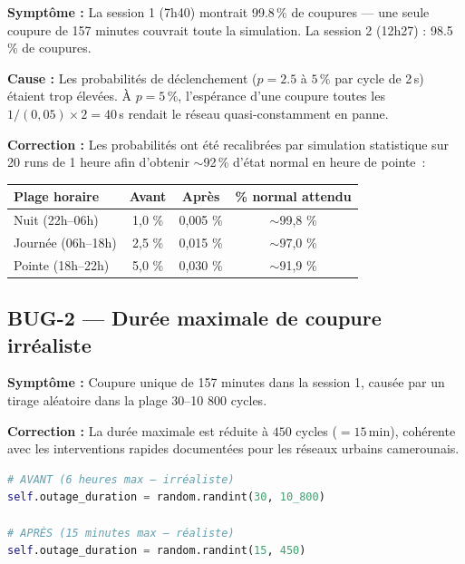 \documentclass[12pt,a4paper]{article}
\begin{document}
\begin{mdframed}[style=danger]
\textbf{Symptôme :} La session 1 (7h40) montrait 99.8\,\% de
coupures — une seule coupure de 157 minutes couvrait toute la
simulation. La session 2 (12h27) : 98.5\,\% de coupures.
\end{mdframed}

\textbf{Cause :} Les probabilités de déclenchement ($p = 2.5$ à
$5\,\%$ par cycle de 2\,s) étaient trop élevées.
À $p = 5\,\%$, l'espérance d'une coupure toutes les $1/(0{,}05)
\times 2 = 40$\,s rendait le réseau quasi-constamment en panne.

\textbf{Correction :} Les probabilités ont été recalibrées par
simulation statistique sur 20 runs de 1 heure afin d'obtenir
$\sim$92\,\% d'état normal en heure de pointe~:

\begin{center}
\begin{tabular}{lccc}
\toprule
\textbf{Plage horaire} & \textbf{Avant} & \textbf{Après} &
\textbf{\% normal attendu} \\
\midrule
Nuit (22h–06h)   & 1{,}0 \%  & 0{,}005 \%  & $\sim$99{,}8 \% \\
Journée (06h–18h) & 2{,}5 \%  & 0{,}015 \%  & $\sim$97{,}0 \% \\
Pointe (18h–22h) & 5{,}0 \%  & 0{,}030 \%  & $\sim$91{,}9 \% \\
\bottomrule
\end{tabular}
\end{center}

\subsection{BUG-2 — Durée maximale de coupure irréaliste}

\begin{mdframed}[style=danger]
\textbf{Symptôme :} Coupure unique de 157 minutes dans la session 1,
causée par un tirage aléatoire dans la plage 30–10 800 cycles.
\end{mdframed}

\textbf{Correction :} La durée maximale est réduite à
$450$ cycles ($= 15$\,min), cohérente avec les interventions
rapides documentées pour les réseaux urbains camerounais.

\begin{lstlisting}[language=Python]
# AVANT (6 heures max — irréaliste)
self.outage_duration = random.randint(30, 10_800)

# APRÈS (15 minutes max — réaliste)
self.outage_duration = random.randint(15, 450)
\end{lstlisting}
\end{document}
